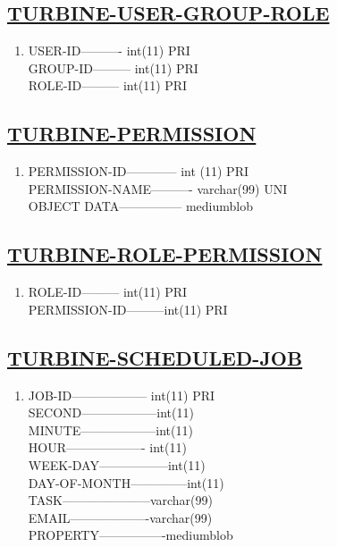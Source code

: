 \documentclass{article}
\begin{document}
\subsection*{\underline{TURBINE-USER-GROUP-ROLE}} 
\begin{enumerate}
\item[{}{}]

USER-ID----------     int(11)                           PRI \\
GROUP-ID---------     int(11)                           PRI \\
ROLE-ID---------    int(11)                           PRI \\
\end{enumerate} 
\subsection*{\underline{TURBINE-PERMISSION}} 
\begin{enumerate}
\item[{}{}]
 
PERMISSION-ID------------         int (11)                     PRI\\ 
PERMISSION-NAME----------         varchar(99)                  UNI \\
OBJECT DATA---------------          mediumblob \\
\end{enumerate} 
\subsection*{\underline{TURBINE-ROLE-PERMISSION}}
\begin{enumerate}
\item[{}{}]

ROLE-ID--------- int(11)        PRI \\
PERMISSION-ID---------int(11)   PRI \\
\end{enumerate} 
\subsection*{\underline{TURBINE-SCHEDULED-JOB}}
\begin{enumerate}
\item[{}{}]

JOB-ID------------------ int(11)      PRI\\ 
SECOND------------------int(11)\\ 
MINUTE------------------int(11)\\ 
HOUR------------------- int(11)\\ 
WEEK-DAY-----------------int(11) \\
DAY-OF-MONTH--------------int(11) \\
TASK---------------------varchar(99) \\
EMAIL-------------------varchar(99) \\
PROPERTY----------------mediumblob\\
\end{enumerate}
\end{document}
